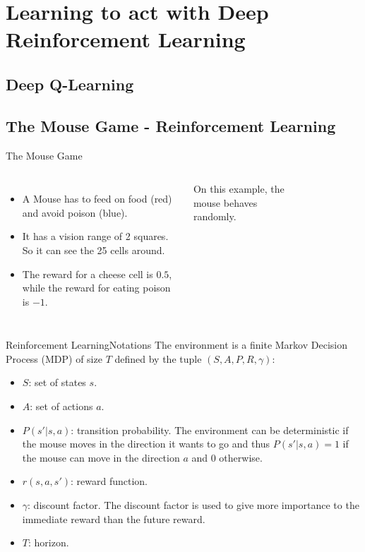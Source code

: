 
\section{Learning to act with Deep Reinforcement Learning}
\subsection{Deep Q-Learning}

\subsection{The Mouse Game - Reinforcement Learning}
\begin{frame}{}{The Mouse Game}
	\begin{columns}[c, onlytextwidth]
		\begin{itemize}
			\item A \alert{Mouse} has to feed on food (red) and avoid poison (blue).
			\item It has a vision range of 2 squares. So it can see the 25 cells around.
			\item The reward for a cheese cell is $0.5$, while the reward for eating poison is $-1$.
		\end{itemize}
		On this example, the mouse behaves randomly.
		\begin{figure}
		\end{figure}
	\end{columns}
\end{frame}

\begin{frame}{Reinforcement Learning}{Notations}
	The environment is a finite Markov Decision Process (MDP) of size $T$ defined by the tuple $(S,A,P,R,\gamma)$:
	\begin{itemize}
		\item $S$: set of states $s$.
		\item $A$: set of actions $a$.
		\item $P(s'|s,a)$: transition probability. The environment can be deterministic if the mouse moves in the direction it wants to go and thus $P(s'|s,a)=1$ if the mouse can move in the direction $a$ and $0$ otherwise.
		\item $r(s,a,s')$: reward function.
		\item $\gamma$: discount factor. The discount factor is used to give more importance to the immediate reward than the future reward.
		\item $T$: horizon.
	\end{itemize}
\end{frame}

